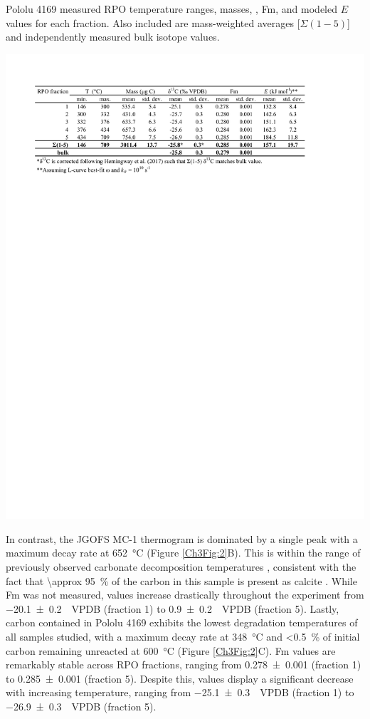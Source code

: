 \begin{table}
	\caption[Pololu 4169 RPO results]{Pololu 4169 measured RPO temperature ranges,  masses, , Fm, and modeled $E$ values for each fraction. Also included are mass-weighted averages [$\Sigma(1-5)$] and independently measured bulk isotope values.}
	\centering
		\includegraphics{Thesis_Tables/Ch3Tab4}
	\label{Ch3Tab:4} 
\end{table}

In contrast, the JGOFS MC-1 thermogram is dominated by a single peak with a maximum decay rate at \SI{652}{\celsius} (Figure \ref{Ch3Fig:2}B). This is within the range of previously observed carbonate decomposition temperatures \citep{Plante:2013tu}, consistent with the fact that \SI{\approx 95}{\%} of the carbon in this sample is present as calcite \citep{Sayles:2001ua}. While Fm was not measured,  values increase drastically throughout the experiment from \SI{-20.1 \pm 0.2}{\permil.VPDB} (fraction 1) to \SI{0.9 \pm 0.2}{\permil.VPDB} (fraction 5). Lastly, carbon contained in Pololu 4169 exhibits the lowest degradation temperatures of all samples studied, with a maximum decay rate at \SI{348}{\celsius} and \SI{<0.5}{\%} of initial carbon remaining unreacted at \SI{600}{\celsius} (Figure \ref{Ch3Fig:2}C). Fm values are remarkably stable across RPO fractions, ranging from \num{0.278 \pm 0.001} (fraction 1) to \num{0.285 \pm 0.001} (fraction 5). Despite this,  values display a significant decrease with increasing temperature, ranging from \SI{-25.1 \pm 0.3}{\permil.VPDB} (fraction 1) to \SI{-26.9 \pm 0.3}{\permil.VPDB} (fraction 5). 

